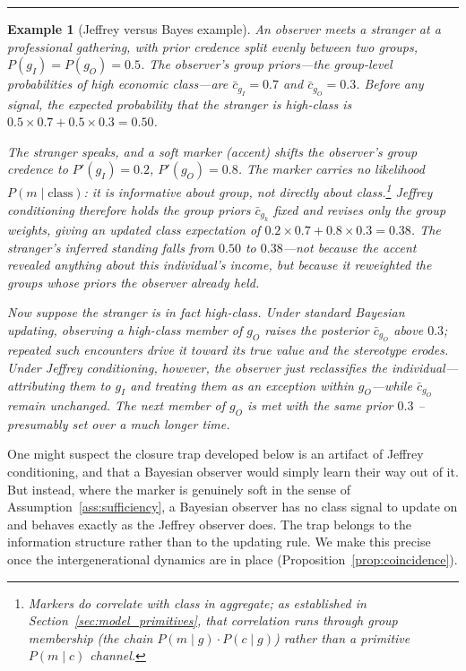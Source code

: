 \documentclass[pdflatex,sn-basic]{sn-jnl}
\theoremstyle{thmstyleone}
\newtheorem{example}[proposition]{Example}
\numberwithin{proposition}{subsection}
\begin{document}
\rule{15cm}{0.4pt}   

\begin{example}[Jeffrey versus Bayes example]
\label{ex:jeffrey-bayes}
An observer meets a stranger at a professional gathering, with prior
credence split evenly between two groups, $P(g_I) = P(g_O) = 0.5$. The
observer's group priors---the group-level probabilities of high economic
class---are $\bar{c}_{g_I} = 0.7$ and $\bar{c}_{g_O} = 0.3$. Before any
signal, the expected probability that the stranger is high-class is
$0.5 \times 0.7 + 0.5 \times 0.3 = 0.50$.

The stranger speaks, and a soft marker (accent) shifts the observer's
group credence to $P'(g_I) = 0.2$, $P'(g_O) = 0.8$. The marker carries
no likelihood $P(m \mid \text{class})$: it is informative about group,
not directly about class.\footnote{Markers do correlate with class in
aggregate; as established in Section~\ref{sec:model_primitives}, that
correlation runs through group membership (the chain $P(m \mid g)\cdot
P(c \mid g)$) rather than a primitive $P(m \mid c)$ channel.} Jeffrey conditioning therefore holds the group
priors $\bar{c}_{g_k}$ fixed and revises only the group weights, giving
an updated class expectation of $0.2 \times 0.7 + 0.8 \times 0.3 = 0.38$.
The stranger's inferred standing falls from $0.50$ to $0.38$---not
because the accent revealed anything about this individual's income, but
because it reweighted the groups whose priors the observer already held.

Now suppose the stranger is in fact high-class. Under standard Bayesian updating,
observing a high-class member of $g_O$ raises the posterior
$\bar{c}_{g_O}$ above $0.3$; repeated such encounters drive it toward its
true value and the stereotype erodes.  Under Jeffrey
conditioning, however, the observer just reclassifies the individual---attributing them
to $g_I$ and treating them as an exception within $g_O$---while
$\bar{c}_{g_O}$ remain unchanged. The next member of $g_O$ is met with the
same prior $0.3$ -- presumably set over a much longer time.
\end{example}

One might suspect the closure trap developed below is an artifact of
Jeffrey conditioning, and that a Bayesian observer would simply learn
their way out of it. But instead, where the marker is genuinely soft in
the sense of Assumption~\ref{ass:sufficiency}, a Bayesian observer has no
class signal to update on and behaves exactly as the Jeffrey observer
does. The trap belongs to the information structure rather than to the
updating rule. We make this precise once the intergenerational dynamics
are in place (Proposition~\ref{prop:coincidence}).
\end{document}
